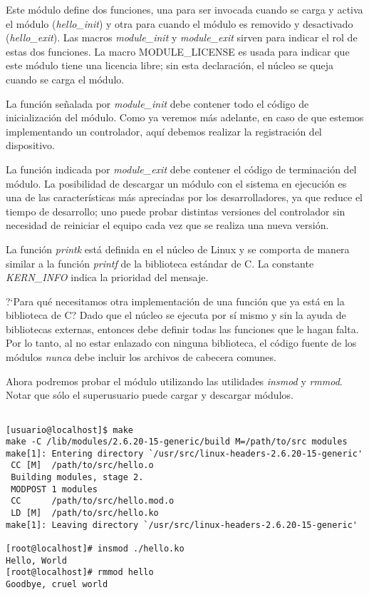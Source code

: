 \documentclass[12pt,a4paper,spanish]{article}
\begin{document}
Este módulo define dos funciones, una para ser invocada cuando se carga y activa el módulo (\textit{hello\_init}) y otra para cuando el módulo es removido y desactivado (\textit{hello\_exit}). Las macros \textit{module\_init} y \textit{module\_exit} sirven para indicar el rol de estas dos funciones. La macro MODULE\_LICENSE es usada para indicar que este módulo tiene una licencia libre; sin esta declaración, el núcleo se queja cuando se carga el módulo.

La función señalada por \textit{module\_init} debe contener todo el código de inicialización del módulo. Como ya veremos más adelante, en caso de que estemos implementando un controlador, aquí debemos realizar la registración del dispositivo.

La función indicada por \textit{module\_exit} debe contener el código de terminación del módulo. La posibilidad de descargar un módulo con el sistema en ejecución es una de las características más apreciadas por los desarrolladores, ya que reduce el tiempo de desarrollo; uno puede probar distintas versiones del controlador sin necesidad de reiniciar el equipo cada vez que se realiza una nueva versión.

La función \textit{printk} está definida en el núcleo de Linux y se comporta de manera similar a la función \textit{printf} de la biblioteca estándar de C. La constante \textit{KERN\_INFO} indica la prioridad del mensaje.

?`Para qué necesitamos otra implementación de una función que ya está en la biblioteca de C? Dado que el núcleo se ejecuta por sí mismo y sin la ayuda de bibliotecas externas, entonces debe definir todas las funciones que le hagan falta. Por lo tanto, al no estar enlazado con ninguna biblioteca, el código fuente de los módulos \textit{nunca} debe incluir los archivos de cabecera comunes.

Ahora podremos probar el módulo utilizando las utilidades \textit{insmod} y \textit{rmmod}. Notar que sólo el superusuario puede cargar y descargar módulos.

\begin{small}
\begin{verbatim}

[usuario@localhost]$ make
make -C /lib/modules/2.6.20-15-generic/build M=/path/to/src modules
make[1]: Entering directory `/usr/src/linux-headers-2.6.20-15-generic'
 CC [M]  /path/to/src/hello.o
 Building modules, stage 2.
 MODPOST 1 modules
 CC      /path/to/src/hello.mod.o
 LD [M]  /path/to/src/hello.ko
make[1]: Leaving directory `/usr/src/linux-headers-2.6.20-15-generic'

[root@localhost]# insmod ./hello.ko
Hello, World
[root@localhost]# rmmod hello
Goodbye, cruel world

\end{verbatim}
\end{small}
\end{document}

